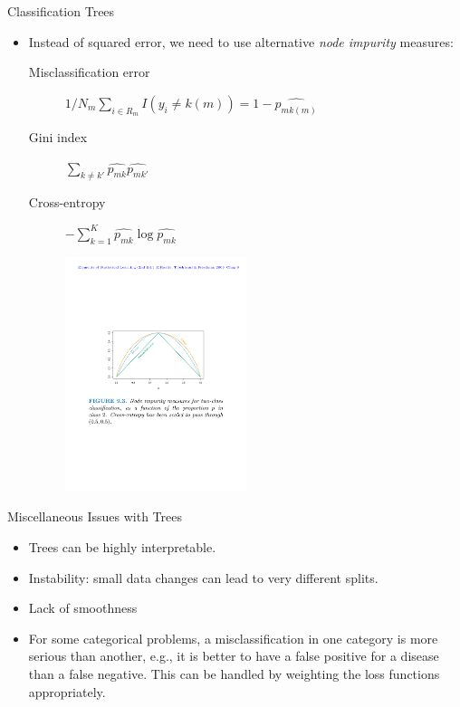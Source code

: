 \documentclass[aspectratio=169]{beamer}
\begin{document}
\begin{frame}{Classification Trees}
    \begin{itemize}
        \item Instead of squared error, we need to use alternative \textit{node impurity} measures: 
        \begin{description}
        \item[Misclassification error] $1/N_m \sum_{i \in R_m} I(y_i \neq k(m)) = 1-\hat{p_{mk(m)}}$
        \item[Gini index] $\sum_{k \neq k'} \hat{p_{mk}}\hat{p_{mk'}}$
        \item[Cross-entropy] $-\sum_{k =1}^K \hat{p_{mk}}\log{\hat{p_{mk}}}$
        \end{description}
        \begin{figure}
            \centering
            \includegraphics[width=0.5\textwidth]{figures/node-impurity-measures.pdf}
        \end{figure}
    \end{itemize}
\end{frame}


\begin{frame}{Miscellaneous Issues with Trees}
    \begin{itemize}
        \item Trees can be highly interpretable.
        \item Instability: small data changes can lead to very different splits.
        \item Lack of smoothness
        \item For some categorical problems, a misclassification in one category is more serious than another, e.g., it is better to have a false positive for a disease than a false negative. This can be handled by weighting the loss functions appropriately.
    \end{itemize}
\end{frame}
\end{document}
